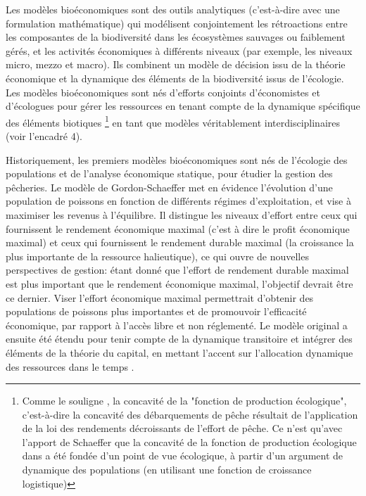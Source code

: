 Les modèles bioéconomiques sont des outils analytiques (c'est-à-dire avec une formulation mathématique) qui modélisent conjointement les rétroactions entre les composantes de la biodiversité dans les écosystèmes sauvages ou faiblement gérés,  et les activités économiques à différents niveaux (par exemple, les niveaux micro, mezzo et macro). Ils combinent un modèle de décision issu de la théorie économique et la dynamique des éléments de la biodiversité issus de l'écologie. Les modèles bioéconomiques \citep{Gordon1954, smith_models_1969, clark_profit_1973} sont nés d'efforts conjoints d'économistes et d'écologues pour gérer les ressources en tenant compte de la dynamique spécifique des éléments biotiques \citep{Parent_Mouysset_Missemer_Levrel_2024}\footnote{Comme le souligne \citep{Parent_Mouysset_Missemer_Levrel_2024}, la concavité de la "fonction de production écologique", c'est-à-dire la concavité des débarquements de pêche résultait de l'application de la loi des rendements décroissants de l'effort de pêche.  Ce n'est qu'avec l'apport de Schaeffer que la concavité de la fonction de production écologique dans \cite{Gordon1954} a été fondée d'un point de vue écologique, à partir d'un argument de dynamique des populations (en utilisant une fonction de croissance logistique)} en tant que modèles véritablement interdisciplinaires (voir l'encadré 4). 


Historiquement, les premiers modèles bioéconomiques sont nés de l'écologie des populations et de l'analyse économique statique, pour étudier la gestion des pêcheries. Le modèle de Gordon-Schaeffer \citep{Gordon1954, Schaefer1954} met en évidence l'évolution d'une population de poissons en fonction de différents régimes d'exploitation, et vise à maximiser les revenus à l'équilibre. Il distingue les niveaux d'effort entre ceux qui fournissent le rendement économique maximal (c'est à dire le profit économique maximal) et ceux qui fournissent le rendement durable maximal (la croissance la plus importante de la ressource halieutique), ce qui ouvre de nouvelles perspectives de gestion: étant donné que l'effort de rendement durable maximal est plus important que le rendement économique maximal, l'objectif  devrait être ce dernier. Viser l'effort économique maximal permettrait d'obtenir des populations de poissons plus importantes et de promouvoir l'efficacité économique, par rapport à l'accès libre et non réglementé. Le modèle original a ensuite été étendu pour tenir compte de la dynamique transitoire et intégrer des éléments de la théorie du capital, en mettant l'accent sur l'allocation dynamique des ressources dans le temps \citep{smith_models_1969, clark_profit_1973}. 


